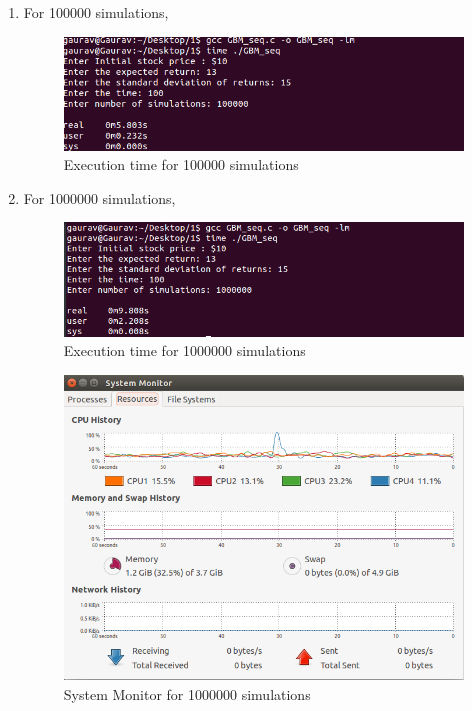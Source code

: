 \documentclass[10pt,a4paper]{article}
\begin{document}
\begin{enumerate}
\item For 100000 simulations,\\
\begin{figure}[h]
\centering
\includegraphics[scale=0.5]{100000_SIM_GBM_SERIAL_C}
\caption{Execution time for 100000 simulations}
\end{figure}

\item For 1000000 simulations,\\
\begin{figure}[h]
\centering
\includegraphics[scale=0.5]{1000000_SIM_GBM_SERIAL_C}
\caption{Execution time for 1000000 simulations}
\end{figure}

\begin{figure}[H]
\centering
\includegraphics[scale=0.5]{CPU_usage_GBM_seq}
\caption{System Monitor for 1000000 simulations}
\end{figure}
\end{enumerate}
\end{document}
